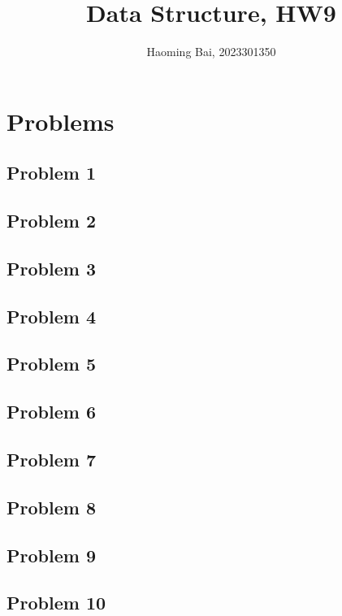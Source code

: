 \documentclass{ctexart}
\title{Data Structure, HW9}
\author{Haoming Bai, 2023301350}
\begin{document}
	\maketitle
  \tableofcontents
  \section{Problems}
  \subsection{Problem 1}
  
  \subsection{Problem 2}
  
  \subsection{Problem 3}
  
  \subsection{Problem 4}
  
  \subsection{Problem 5}
  
  \subsection{Problem 6}
  
  \subsection{Problem 7}
  
  \subsection{Problem 8}
  
  \subsection{Problem 9}
  
  \subsection{Problem 10}
  
\end{document}

